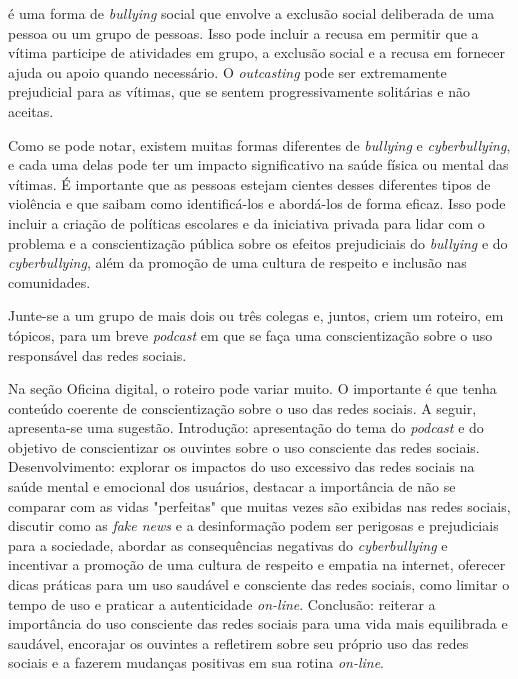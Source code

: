  é uma forma de {\em bullying} social que
envolve a exclusão social deliberada de uma pessoa ou um grupo de
pessoas. Isso pode incluir a recusa em permitir que a vítima participe
de atividades em grupo, a exclusão social e a recusa em fornecer ajuda
ou apoio quando necessário. O {\em outcasting} pode ser extremamente
prejudicial para as vítimas, que se sentem progressivamente solitárias e
não aceitas.
\stopitemize

Como se pode notar, existem muitas formas diferentes de {\em bullying} e
{\em cyberbullying}, e cada uma delas pode ter um impacto significativo
na saúde física ou mental das vítimas. É importante que as pessoas
estejam cientes desses diferentes tipos de violência e que saibam como
identificá-los e abordá-los de forma eficaz. Isso pode incluir a criação
de políticas escolares e da iniciativa privada para lidar com o problema
e a conscientização pública sobre os efeitos prejudiciais do
{\em bullying} e do {\em cyberbullying}, além da promoção de uma cultura
de respeito e inclusão nas comunidades.

\startOFICINA
\color[darkgreen]{\bfb Oficina digital}

Junte-se a um grupo de mais dois ou três colegas e, juntos, criem um
roteiro, em tópicos, para um breve {\em podcast} em que se faça uma
conscientização sobre o uso responsável das redes sociais.


Na seção Oficina digital, o roteiro pode variar muito. O importante é
que tenha conteúdo coerente de conscientização sobre o uso das redes
sociais. A seguir, apresenta-se uma sugestão. Introdução: apresentação
do tema do {\em podcast} e do objetivo de conscientizar os ouvintes
sobre o uso consciente das redes sociais. Desenvolvimento: explorar os
impactos do uso excessivo das redes sociais na saúde mental e emocional
dos usuários, destacar a importância de não se comparar com as vidas
"perfeitas" que muitas vezes são exibidas nas redes sociais, discutir
como as {\em fake news} e a desinformação podem ser perigosas e
prejudiciais para a sociedade, abordar as consequências negativas do
{\em cyberbullying} e incentivar a promoção de uma cultura de respeito e
empatia na internet, oferecer dicas práticas para um uso saudável e
consciente das redes sociais, como limitar o tempo de uso e praticar a
autenticidade {\em on-line}. Conclusão: reiterar a importância do uso
consciente das redes sociais para uma vida mais equilibrada e saudável,
encorajar os ouvintes a refletirem sobre seu próprio uso das redes
sociais e a fazerem mudanças positivas em sua rotina {\em on-line}.
\stopOFICINA

